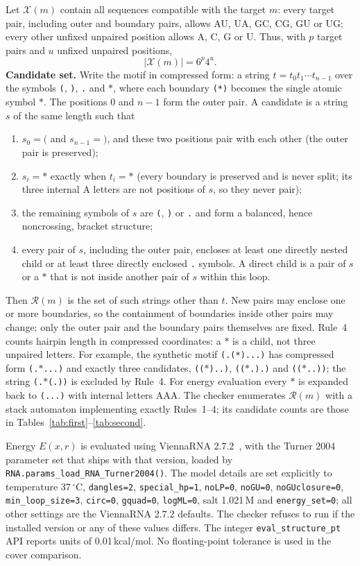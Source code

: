 \documentclass[10pt,a4paper]{article}
\newcommand{\Rset}{\mathcal R}
\newcommand{\Xset}{\mathcal X}
\begin{document}
Let $\Xset(m)$ contain all sequences compatible with the target $m$: every target pair, including outer and boundary pairs, allows AU, UA, GC, CG, GU or UG; every other unfixed unpaired position allows A, C, G or U. Thus, with $p$ target pairs and $u$ unfixed unpaired positions,
\[
 |\Xset(m)|=6^p4^u.
\]
\textbf{Candidate set.} Write the motif in compressed form: a string $t=t_0t_1\cdots t_{n-1}$ over the symbols \texttt{(}, \texttt{)}, \texttt{.} and $\ast$, where each boundary \texttt{(*)} becomes the single atomic symbol $\ast$. The positions $0$ and $n-1$ form the outer pair. A candidate is a string $s$ of the same length such that
\begin{enumerate}\itemsep0pt
\item $s_0=\texttt{(}$ and $s_{n-1}=\texttt{)}$, and these two positions pair with each other (the outer pair is preserved);
\item $s_i=\ast$ exactly when $t_i=\ast$ (every boundary is preserved and is never split; its three internal A letters are not positions of $s$, so they never pair);
\item the remaining symbols of $s$ are \texttt{(}, \texttt{)} or \texttt{.} and form a balanced, hence noncrossing, bracket structure;
\item every pair of $s$, including the outer pair, encloses at least one directly nested child or at least three directly enclosed \texttt{.} symbols. A direct child is a pair of $s$ or a $\ast$ that is not inside another pair of $s$ within this loop.
\end{enumerate}
Then $\Rset(m)$ is the set of such strings other than $t$. New pairs may enclose one or more boundaries, so the containment of boundaries inside other pairs may change; only the outer pair and the boundary pairs themselves are fixed. Rule~4 counts hairpin length in compressed coordinates: a $\ast$ is a child, not three unpaired letters. For example, the synthetic motif \texttt{(.(*)...)} has compressed form \texttt{(.$\ast$...)} and exactly three candidates, \texttt{(($\ast$)..)}, \texttt{(($\ast$.).)} and \texttt{(($\ast$..))}; the string \texttt{(.$\ast$(.))} is excluded by Rule~4. For energy evaluation every $\ast$ is expanded back to \texttt{(...)} with internal letters AAA. The checker enumerates $\Rset(m)$ with a stack automaton implementing exactly Rules~1--4; its candidate counts are those in Tables~\ref{tab:first}--\ref{tab:second}.

Energy $E(x,r)$ is evaluated using ViennaRNA 2.7.2~\cite{vienna,vienna2}, with the Turner 2004 parameter set that ships with that version, loaded by \texttt{RNA.params\_load\_RNA\_Turner2004()}. The model details are set explicitly to temperature 37\,$^\circ$C, \texttt{dangles=2}, \texttt{special\_hp=1}, \texttt{noLP=0}, \texttt{noGU=0}, \texttt{noGUclosure=0}, \texttt{min\_loop\_size=3}, \texttt{circ=0}, \texttt{gquad=0}, \texttt{logML=0}, salt 1.021\,M and \texttt{energy\_set=0}; all other settings are the ViennaRNA 2.7.2 defaults. The checker refuses to run if the installed version or any of these values differs. The integer \texttt{eval\_structure\_pt} API reports units of 0.01\,kcal/mol. No floating-point tolerance is used in the cover comparison.
\end{document}
